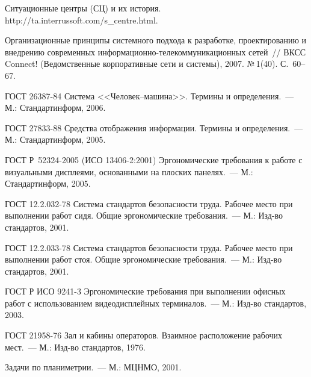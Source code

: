 \begin{multicols}{2}
{{\begin{thebibliography}{99}
Ситуационные центры (СЦ) и их история. {\sf http://\linebreak ta.interrussoft.com/s\_centre.html}.

Организационные принципы сис\-тем\-но\-го подхода к разработке, проектированию и 
внедрению современных информационно-те\-ле\-ком\-му\-никационных сетей~// ВКСС 
Connect! (Ведомственные корпоративные сети и системы), 2007. №\,1(40). С.~60--67.

ГОСТ 26387-84 Система <<Человек--машина>>. Термины и определения.~--- М.: 
Стандартинформ, 2006.

ГОСТ 27833-88 Средства отображения информации. Термины и определения.~--- М.: 
Стандартинформ, 2005.

ГОСТ Р~52324-2005 (ИСО 13406-2:2001) Эргономические требования к работе с 
визуальными дисплеями, основанными на плоских панелях.~--- М.: Стандартинформ, 
2005.

ГОСТ 12.2.032-78 Система стандартов безопасности труда. Рабочее место при 
выполнении работ сидя. Общие эргономические требования.~--- М.: Изд-во 
стандартов, 2001.

ГОСТ 12.2.033-78 Система стандартов безопасности труда. Рабочее место при 
выполнении работ стоя. Общие эргономические требования.~--- М.: Изд-во 
стандартов, 2001.

ГОСТ Р ИСО 9241-3 Эргономические требования при выполнении офисных работ с 
использованием видеодисплейных терминалов.~--- М.: Изд-во стандартов, 2003.

ГОСТ 21958-76 Зал и кабины операторов. Взаимное расположение рабочих мест.~--- 
М.: Изд-во стандартов, 1976.

\label{end\stat}

Задачи по планиметрии.~--- М.: \mbox{МЦНМО}, 2001.


 \end{thebibliography}
}
}


\end{multicols}